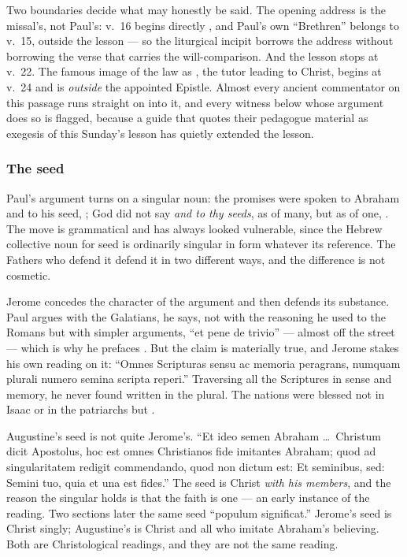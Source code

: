 Two boundaries decide what may honestly be said. The opening address
 is the missal's, not Paul's: v.~16 begins directly
, and Paul's own ``Brethren'' belongs to
v.~15, outside the lesson --- so the liturgical incipit borrows the address
without borrowing the verse that carries the will-comparison. And the lesson
stops at v.~22. The famous image of the law as , the tutor leading to Christ, begins at v.~24 and is \textit{outside}
the appointed Epistle. Almost every ancient commentator on this passage runs
straight on into it, and every witness below whose argument does so is flagged,
because a guide that quotes their pedagogue material as exegesis of this
Sunday's lesson has quietly extended the lesson.

\subsubsection*{The seed}

Paul's argument turns on a singular noun: the promises were spoken to Abraham
and to his seed, ; God did not say \textit{and to thy
seeds}, as of many, but as of one, .
The move is grammatical and has always looked vulnerable, since the Hebrew
collective noun for seed is ordinarily singular in form whatever its
reference. The Fathers who defend it defend it in two different ways, and the
difference is not cosmetic.

\begin{witnessnote}
Jerome concedes the character of the argument and then defends its substance.
Paul argues with the Galatians, he says, not with the reasoning he used to the
Romans but with simpler arguments, ``et pene de trivio'' --- almost off the
street --- which is why he prefaces . But the
claim is materially true, and Jerome stakes his own reading on it: ``Omnes
Scripturas sensu ac memoria peragrans, numquam plurali numero semina scripta
reperi.'' Traversing all the Scriptures in sense and memory, he never found
 written in the plural. The nations were blessed not in Isaac or
in the patriarchs but .
\end{witnessnote}

\begin{witnessnote}
Augustine's seed is not quite Jerome's. ``Et ideo semen Abraham \dots\ Christum
dicit Apostolus, hoc est omnes Christianos fide imitantes Abraham; quod ad
singularitatem redigit commendando, quod non dictum est: Et seminibus, sed:
Semini tuo, quia et una est fides.'' The seed is Christ \textit{with his
members}, and the reason the singular holds is that the faith is one --- an
early instance of the  reading. Two sections later the
same seed ``populum significat.'' Jerome's seed is Christ singly; Augustine's
is Christ and all who imitate Abraham's believing. Both are Christological
readings, and they are not the same reading.
\end{witnessnote}

